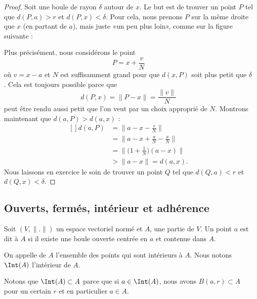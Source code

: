 \begin{proof}
	Soit une boule de rayon \( \delta\) autour de \( x\). Le but est de trouver un point \( P\) tel que \( d(P,a)>r\) et \( d(P,x)<\delta\). Pour cela, nous prenons \( P\) sur la même droite que \( x\) (en partant de \( a\)), mais juste «un peu plus loin», comme sur la figure suivante :

	\begin{center}
		
	\end{center}

	Plus précisément, nous considérons le point
	\begin{equation}
		P=x+\frac{ v }{ N }
	\end{equation}
	où \( v=x-a\) et \( N\) est suffisamment grand pour que \( d(x,P)\) soit plus petit que \( \delta\). Cela est toujours possible parce que
	\begin{equation}
		d(P,x)=\| P-x \|=\frac{ \| v \| }{ N }
	\end{equation}
	peut être rendu aussi petit que l'on veut par un choix approprié de \( N\). Montrons maintenant que \( d(a,P)>d(a,x)\) :
	\begin{equation}
		\begin{aligned}[]
			d(a,P) & =\| a-x-\frac{ v }{ N }\|                  \\
			       & =\| a-x+\frac{ a }{ N }-\frac{ x }{ N } \| \\
			       & =\| \big( 1+\frac{1}{ N }\big)(a-x) \|     \\
			       & >\| a-x \|=d(a,x).
		\end{aligned}
	\end{equation}
	Nous laissons en exercice le soin de trouver un point \( Q\) tel que \( d(Q,a)<r\) et \( d(Q,x)<\delta\).
\end{proof}


\subsection{Ouverts, fermés, intérieur et adhérence}

\begin{definition}
	Soit \( (V,\| . \|)\) un espace vectoriel normé et \( A\), une partie de \( V\). Un point \( a\) est dit  à \( A\) si il existe une boule ouverte centrée en \( a\) et contenue dans \( A\).

	On appelle  de \( A\) l'ensemble des points qui sont intérieurs à \( A\). Nous notons \( \Int(A)\) l'intérieur de \( A\).
\end{definition}
Notons que \( \Int(A)\subset A\) parce que si \( a\in\Int(A)\), nous avons \( B(a,r)\subset A\) pour un certain \( r\) et en particulier \( a\in A\).

